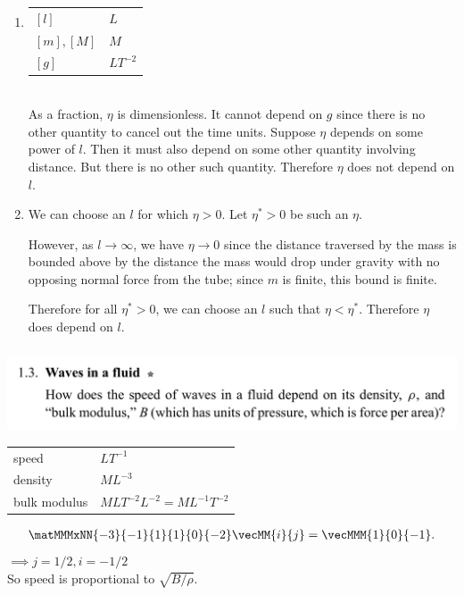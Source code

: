 \begin{enumerate}
\item
  \begin{tabular}{l|l}
    $[l]$       & $L$ \\
    $[m], [M]$  & $M$ \\
    $[g]$       & $LT^{-2}$
  \end{tabular}\\
  As a fraction, $\eta$ is dimensionless. It cannot depend on $g$ since there is no other
  quantity to cancel out the time units. Suppose $\eta$ depends on some power of $l$. Then it must
  also depend on some other quantity involving distance. But there is no other
  such quantity. Therefore $\eta$ does not depend on $l$.  \checkmark

\item {} We can choose an $l$ for which $\eta > 0$. Let $\eta^* > 0$ be such
  an $\eta$.

  However, as $l \to \infty$, we have $\eta \to 0$ since the distance traversed by the mass is bounded
  above by the distance the mass would drop under gravity with no opposing normal force from the tube;
  since $m$ is finite, this bound is finite.

  Therefore for all $\eta^* > 0$, we can choose an $l$ such that $\eta < \eta^*$. Therefore $\eta$
  does depend on $l$.
\end{enumerate}

\subsubsection*{}
\begin{mdframed}
  \includegraphics[width=400pt]{img/physics--classical-mechanics--morin--1-3.png}
\end{mdframed}

\begin{tabular}{l|l}
  speed   & $LT^{-1}$ \\
  density & $ML^{-3}$ \\
  bulk modulus & $MLT^{-2}L^{-2} = ML^{-1}T^{-2}$
\end{tabular}

\begin{align*}
  \matMMMxNN
  {-3}{-1}
  {1}{1}
  {0}{-2} \vecMM{i}{j} = \vecMMM{1}{0}{-1}.
\end{align*}
$\implies j = 1/2, i = -1/2$\\
So speed is proportional to $\sqrt{B/\rho}$. \checkmark

